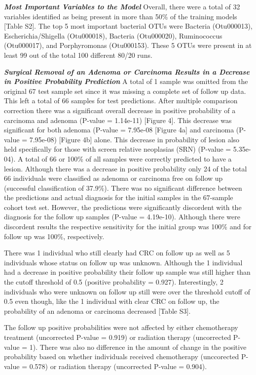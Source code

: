 \documentclass[12pt,]{article}
\begin{document}
\textbf{\emph{Most Important Variables to the Model}} Overall, there
were a total of 32 variables identified as being present in more than
50\% of the training models {[}Table S2{]}. The top 5 most important
bacterial OTUs were Bacteria (Otu000013), Escherichia/Shigella
(Otu000018), Bacteria (Otu000020), Ruminococcus (Otu000017), and
Porphyromonas (Otu000153). These 5 OTUs were present in at least 99 out
of the total 100 different 80/20 runs.

\textbf{\emph{Surgical Removal of an Adenoma or Carcinoma Results in a
Decrease in Positive Probability Prediction}} A total of 1 sample was
omitted from the original 67 test sample set since it was missing a
complete set of follow up data. This left a total of 66 samples for test
predictions. After multiple comparison correction there was a
significant overall decrease in positive probability of a carcinoma and
adenoma (P-value = 1.14e-11) {[}Figure 4{]}. This decrease was
significant for both adenoma (P-value = 7.95e-08 {[}Figure 4a{]} and
carcinoma (P-value = 7.95e-08) {[}Figure 4b{]} alone. This decrease in
probability of lesion also held specifically for those with screen
relative neoplasias (SRN) (P-value = 5.35e-04). A total of 66 or 100\%
of all samples were correctly predicted to have a lesion. Although there
was a decrease in positive probability only 24 of the total 66
individuals were classified as adenoma or carcinoma free on follow up
(successful classification of 37.9\%). There was no significant
difference between the predictions and actual diagnosis for the initial
samples in the 67-sample cohort test set. However, the predictions were
significantly discordent with the diagnosis for the follow up samples
(P-value = 4.19e-10). Although there were discordent results the
respective sensitivity for the initial group was 100\% and for follow up
was 100\%, respectively.

There was 1 individual who still clearly had CRC on follow up as well as
5 individuals whose status on follow up was unknown. Although the 1
individual had a decrease in positive probability their follow up sample
was still higher than the cutoff threshold of 0.5 (positive probability
= 0.927). Interestingly, 2 individuals who were unknown on follow up
still were over the threshold cutoff of 0.5 even though, like the 1
individual with clear CRC on follow up, the probability of an adenoma or
carcinoma decreased {[}Table S3{]}.

The follow up positive probabilities were not affected by either
chemotherapy treatment (uncorrected P-value = 0.919) or radiation
therapy (uncorrected P-value = 1). There was also no difference in the
amount of change in the positive probability based on whether
individuals received chemotherapy (unccorected P-value = 0.578) or
radiation therapy (uncorrected P-value = 0.904).
\end{document}
